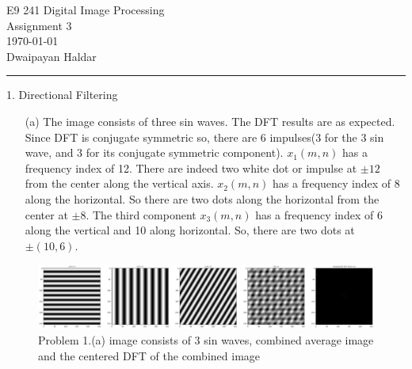 \documentclass[12pt,a4paper,onecolumn]{exam}
\newcommand{\questionheader}[1]{%
  \begin{tcolorbox}[
    enhanced,
    colback=black,
    coltext=white,
    boxrule=0pt,              
    fontupper=\Large\bfseries, 
    arc=4mm                   
  ]
  #1 
  \end{tcolorbox}%
}
\begin{document}
\begingroup  
    \centering
    \LARGE E9 241 Digital Image Processing\\
    \LARGE Assignment 3\\[0.5em]
    \large \today\\[0.5em]
    \large Dwaipayan Haldar\par
\endgroup
\noindent\rule{\textwidth}{0.5pt}
\printanswers
\renewcommand{\solutiontitle}{\noindent\textbf{Ans:}\enspace}

\questionheader{1. Directional Filtering}

\begin{solution}
\begin{itemize}
    \item[(a)] 
The image consists of three sin waves. The DFT results are as expected. Since DFT is conjugate symmetric so, there are 6 impulses(3 for the 3 sin wave, and 3 for its conjugate symmetric component). $x_1(m,n)$ has a frequency index of 12. There are indeed two white dot or impulse at $\pm 12$ from the center along the vertical axis. $x_2(m,n)$ has a frequency index of 8 along the horizontal. So there are two dots along the horizontal from the center at $\pm 8$. The third component $x_3(m,n)$ has a frequency index of 6 along the vertical and 10 along horizontal. So, there are two dots at $\pm(10,6)$. 
\end{itemize}
        \begin{figure}[H]
        \centering
        \includegraphics[scale = .18]{Output_Images/P01a.png}
        \caption{Problem 1.(a) image consists of 3 sin waves, combined average image and the centered DFT of the combined image}
        \label{fig:1a}
        \end{figure}


\end{solution}
\end{document}
